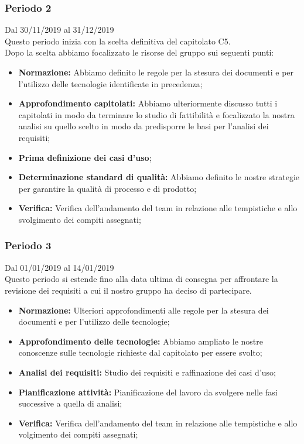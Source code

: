 \subsubsection{Periodo 2} 
Dal 30/11/2019 al 31/12/2019\\
Questo periodo inizia con la scelta definitiva del capitolato C5.\\
Dopo la scelta abbiamo focalizzato le risorse del gruppo sui seguenti punti:
\begin{itemize}
	\item \textbf{Normazione: }Abbiamo definito le regole per la stesura dei documenti e per l'utilizzo delle tecnologie identificate in precedenza;
	\item \textbf{Approfondimento capitolati: }Abbiamo ulteriormente discusso tutti i capitolati in modo da terminare lo studio di fattibilità e focalizzato la nostra analisi su quello scelto in modo da predisporre le basi per l'analisi dei requisiti;
	\item \textbf{Prima definizione dei casi d'uso};
	\item \textbf{Determinazione standard di qualità: }Abbiamo definito le nostre strategie per garantire la qualità di processo e di prodotto;
	\item \textbf{Verifica: }Verifica dell'andamento del team in relazione alle tempistiche e allo svolgimento dei compiti assegnati;
\end{itemize}
\subsubsection{Periodo 3}
 Dal 01/01/2019 al 14/01/2019\\
 Questo periodo si estende fino alla data ultima di consegna per affrontare la revisione dei requisiti a cui il nostro gruppo ha deciso di partecipare.\\
 \begin{itemize}
	\item \textbf{Normazione: }Ulteriori approfondimenti alle regole per la stesura dei documenti e per l'utilizzo delle tecnologie;
	\item \textbf{Approfondimento delle tecnologie: }Abbiamo ampliato le nostre conoscenze sulle tecnologie richieste dal capitolato per essere svolto;
	\item \textbf{Analisi dei requisiti: } Studio dei requisiti e raffinazione dei casi d'uso;
	\item \textbf{Pianificazione attività: }Pianificazione del lavoro da svolgere nelle fasi successive a quella di analisi;
	\item \textbf{Verifica: }Verifica dell'andamento del team in relazione alle tempistiche e allo volgimento dei compiti assegnati;

 \end{itemize}
